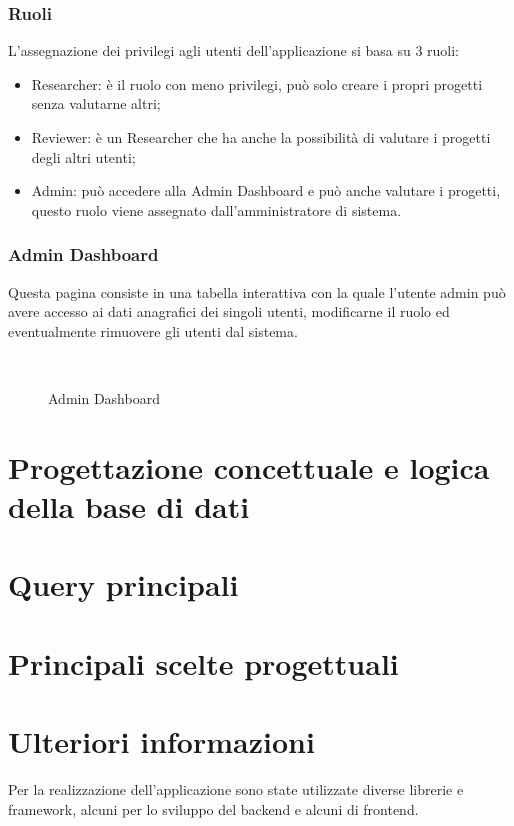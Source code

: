 \documentclass{article}
\begin{document}
\subsubsection{Ruoli}
L'assegnazione dei privilegi agli utenti dell'applicazione si basa su 3 ruoli: 
\begin{itemize}
    \item Researcher: è il ruolo con meno privilegi, può solo creare i propri progetti senza valutarne altri;
    \item Reviewer: è un Researcher che ha anche la possibilità di valutare i progetti degli altri utenti;
    \item Admin: può accedere alla Admin Dashboard e può anche valutare i progetti, questo ruolo viene assegnato dall'amministratore di sistema.
\end{itemize}
\subsubsection{Admin Dashboard}
Questa pagina consiste in una tabella interattiva con la quale l'utente admin può avere accesso ai dati anagrafici dei singoli utenti, modificarne il ruolo ed eventualmente rimuovere gli utenti dal sistema.
\begin{figure}[!h] 
    \centering
    \\
    \caption{Admin Dashboard}
\end{figure}

\section{Progettazione concettuale e logica della base di dati}

\section{Query principali}

\section{Principali scelte progettuali}

\section{Ulteriori informazioni}
Per la realizzazione dell'applicazione sono state utilizzate diverse librerie e framework, alcuni per lo sviluppo del backend e alcuni di frontend.
\end{document}
